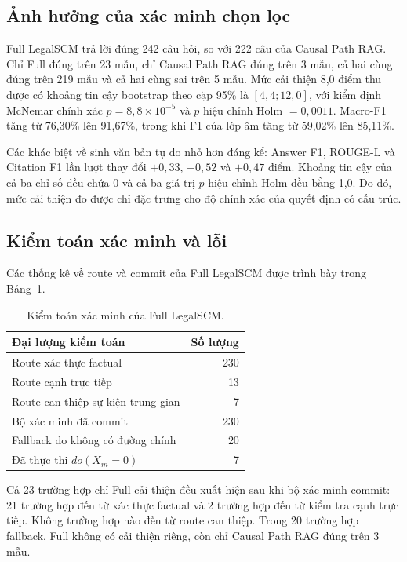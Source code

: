 \subsection{Ảnh hưởng của xác minh chọn lọc}

Full LegalSCM trả lời đúng 242 câu hỏi, so với 222 câu của Causal Path RAG. Chỉ
Full đúng trên 23 mẫu, chỉ Causal Path RAG đúng trên 3 mẫu, cả hai cùng đúng
trên 219 mẫu và cả hai cùng sai trên 5 mẫu. Mức cải thiện 8,0 điểm thu được có
khoảng tin cậy bootstrap theo cặp 95\% là $[4{,}4;12{,}0]$, với kiểm định
McNemar chính xác $p=8{,}8\times10^{-5}$ và $p$ hiệu chỉnh Holm $=0{,}0011$.
Macro-F1 tăng từ 76,30\% lên 91,67\%, trong khi F1 của lớp âm tăng từ 59,02\%
lên 85,11\%.

Các khác biệt về sinh văn bản tự do nhỏ hơn đáng kể: Answer F1, ROUGE-L và
Citation F1 lần lượt thay đổi $+0{,}33$, $+0{,}52$ và $+0{,}47$ điểm. Khoảng
tin cậy của cả ba chỉ số đều chứa 0 và cả ba giá trị $p$ hiệu chỉnh Holm đều
bằng 1,0. Do đó, mức cải thiện đo được chỉ đặc trưng cho độ chính xác của quyết
định có cấu trúc.

\subsection{Kiểm toán xác minh và lỗi}

Các thống kê về route và commit của Full LegalSCM được trình bày trong
Bảng~\ref{tab:route_audit}.

\begin{table}[t]
\centering
\caption{Kiểm toán xác minh của Full LegalSCM.}
\label{tab:route_audit}
\small
\begin{tabular}{lr}
\toprule
\textbf{Đại lượng kiểm toán} & \textbf{Số lượng}\\
\midrule
Route xác thực factual & 230\\
Route cạnh trực tiếp & 13\\
Route can thiệp sự kiện trung gian & 7\\
Bộ xác minh đã commit & 230\\
Fallback do không có đường chính & 20\\
Đã thực thi $do(X_m=0)$ & 7\\
\bottomrule
\end{tabular}
\end{table}

Cả 23 trường hợp chỉ Full cải thiện đều xuất hiện sau khi bộ xác minh commit:
21 trường hợp đến từ xác thực factual và 2 trường hợp đến từ kiểm tra cạnh trực
tiếp. Không trường hợp nào đến từ route can thiệp. Trong 20 trường hợp
fallback, Full không có cải thiện riêng, còn chỉ Causal Path RAG đúng trên 3
mẫu.

